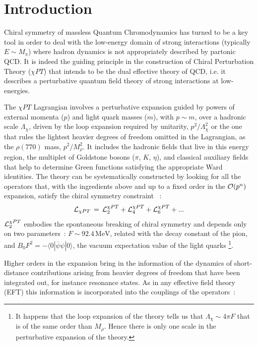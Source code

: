 \documentclass{appolb}
\begin{document}
\section{Introduction}
Chiral symmetry of massless Quantum Chromodynamics has turned to be a key tool in order to deal with the low-energy domain of strong interactions (typically $E \sim M_{\pi}$) where hadron dynamics is not 
appropriately described by partonic QCD.
It is indeed the guiding principle in the construction of Chiral Perturbation Theory ($\chi PT$)
\cite{Weinberg:1978kz,Gasser:1983yg,Gasser:1984gg} that intends to be the dual effective theory of QCD,
i.e. it describes a perturbative quantum field theory of strong interactions at low-energies.
\par
The $\chi PT$ Lagrangian involves a perturbative expansion guided by powers of external momenta ($p$) and light quark masses ($m$), with $p \sim m$, over a hadronic scale $\Lambda_{\chi}$, driven by the loop expansion required by unitarity, $p^2/\Lambda_{\chi}^2$ or the one that rules the lightest heavier degrees of freedom omitted in the Lagrangian, as the $\rho(770)$ mass, $p^2/M_{\rho}^2$.
It includes the hadronic fields that live in this energy region, the multiplet of Goldstone bosons ($\pi$, $K$, $\eta$), and classical auxiliary fields that help to determine Green functions satisfying the appropriate Ward identities. The theory can be systematically constructed by looking for all the operators  that, with the ingredients above and up to a fixed order in the ${\cal O}(p^n)$ expansion, satisfy the chiral symmetry constraint \cite{Ecker:1994gg}~:
\begin{equation}
{\cal L}_{\chi PT} \, = \, {\cal L}_2^{\chi PT} + {\cal L}_4^{\chi PT} + {\cal L}_6^{\chi PT} + ...  
\end{equation}
${\cal L}_2^{\chi PT}$ embodies the spontaneous breaking of chiral symmetry and depends only on two parameters~: $F \sim 92.4 \, \mbox{MeV}$, related with the decay constant of the pion, and $B_0 F^2 = - \langle 0 | \overline{\psi} \psi |0 \rangle$, the vacuum expectation value of the light quarks \footnote{It happens that the loop expansion of the theory tells us that $\Lambda_{\chi} \sim 4 \pi F$ that is of the same order than $M_{\rho}$. Hence there is only one scale in the perturbative expansion of the theory.}.
\par
Higher orders in the expansion bring in the information of the dynamics of short-distance contributions arising from heavier degrees of freedom that have been integrated out, for instance resonance states. As in any effective field theory (EFT) this information is incorporated into the couplings of the operators~:
\end{document}
